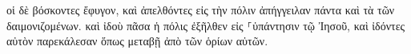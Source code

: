 \documentclass{openreader}
\begin{document}
οἱ δὲ βόσκοντες ἔφυγον, καὶ ἀπελθόντες εἰς τὴν πόλιν ἀπήγγειλαν πάντα καὶ τὰ τῶν δαιμονιζομένων. 
καὶ ἰδοὺ πᾶσα ἡ πόλις ἐξῆλθεν εἰς ⸀ὑπάντησιν τῷ Ἰησοῦ, καὶ ἰδόντες αὐτὸν παρεκάλεσαν ὅπως μεταβῇ ἀπὸ τῶν ὁρίων αὐτῶν. 
\end{document}
